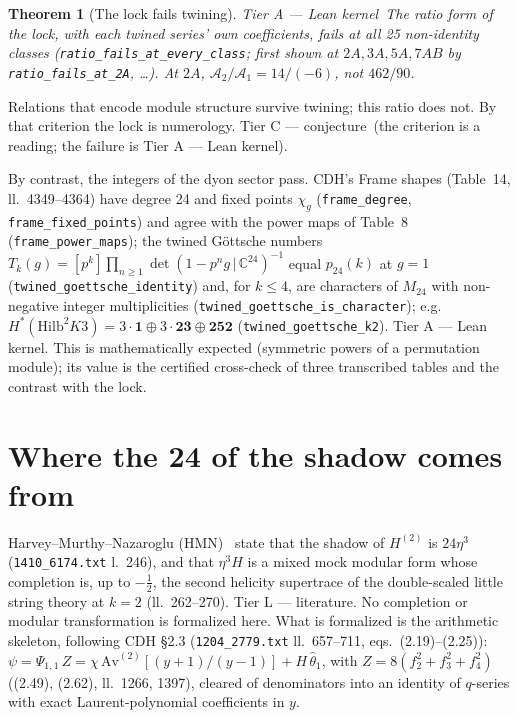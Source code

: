 \documentclass[11pt,a4paper]{article}
\newtheorem{theorem}{Theorem}[section]
\theoremstyle{remark}
\newcommand{\tierA}{\colorbox{green!15}{\textsf{\scriptsize Tier A --- Lean kernel}}}
\newcommand{\tierL}{\colorbox{blue!10}{\textsf{\scriptsize Tier L --- literature}}}
\newcommand{\tierC}{\colorbox{orange!15}{\textsf{\scriptsize Tier C --- conjecture}}}
\newcommand{\lean}[1]{\texttt{#1}}
\newcommand{\Mtf}{M_{24}}
\begin{document}
\begin{theorem}[The lock fails twining] \tierA\
The ratio form of the lock, with each twined series' own coefficients, fails at all 25 non-identity
classes (\lean{ratio\_fails\_at\_every\_class}; first shown at $2A,3A,5A,7AB$ by
\lean{ratio\_fails\_at\_2A}, \dots). At $2A$, $\mathcal{A}_2/\mathcal{A}_1=14/(-6)$, not $462/90$.
\end{theorem}
Relations that encode module structure survive twining; this ratio does not. By that criterion the lock
is numerology. \tierC\ (the criterion is a reading; the failure is \tierA).

By contrast, the integers of the dyon sector pass. CDH's Frame shapes (Table~14, ll.~4349--4364) have
degree 24 and fixed points $\chi_g$ (\lean{frame\_degree}, \lean{frame\_fixed\_points}) and agree with the
power maps of Table~8 (\lean{frame\_power\_maps}); the twined Göttsche numbers
$T_k(g)=[p^k]\prod_{n\ge1}\det(1-p^ng\,|\,\mathbb{C}^{24})^{-1}$ equal $p_{24}(k)$ at $g=1$
(\lean{twined\_goettsche\_identity}) and, for $k\le4$, are characters of $\Mtf$ with non-negative
integer multiplicities (\lean{twined\_goettsche\_is\_character}); e.g.
$H^*(\mathrm{Hilb}^2K3)=3\cdot\mathbf{1}\oplus3\cdot\mathbf{23}\oplus\mathbf{252}$
(\lean{twined\_goettsche\_k2}). \tierA. This is mathematically expected (symmetric powers of a
permutation module); its value is the certified cross-check of three transcribed tables and the contrast
with the lock.

\section{Where the 24 of the shadow comes from}
\label{sec:shadow}
Harvey--Murthy--Nazaroglu (HMN)~\cite{HMN2014} state that the shadow of $H^{(2)}$ is $24\eta^3$
(\texttt{1410\_6174.txt} l.~246), and that $\eta^3H$ is a mixed mock modular form whose completion is,
up to $-\tfrac12$, the second helicity supertrace of the double-scaled little string theory at $k=2$
(ll.~262--270). \tierL. No completion or modular transformation is formalized here. What is formalized
is the arithmetic skeleton, following CDH §2.3 (\texttt{1204\_2779.txt} ll.~657--711, eqs.~(2.19)--(2.25)):
$\psi=\Psi_{1,1}\,Z=\chi\,\mathrm{Av}^{(2)}[(y+1)/(y-1)]+H\,\hat\theta_1$, with $Z=8(f_2^2+f_3^2+f_4^2)$
((2.49), (2.62), ll.~1266, 1397), cleared of denominators into an identity of $q$-series with exact
Laurent-polynomial coefficients in $y$.
\end{document}
